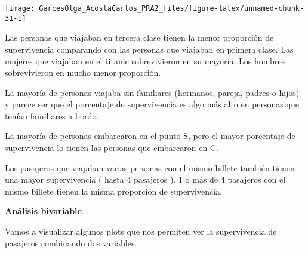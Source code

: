 \documentclass[
]{article}
\begin{document}
\begin{center}\texttt{[image: GarcesOlga\_AcostaCarlos\_PRA2\_files/figure-latex/unnamed-chunk-31-1]} \end{center}

Las personas que viajaban en tercera clase tienen la menor proporción de
supervivencia comparando con las personas que viajaban en primera clase.
Las mujeres que viajaban en el titanic sobrevivieron en su mayoría. Los
hombres sobrevivieron en mucho menor proporción.

La mayoría de personas viajaba sin familiares (hermanos, pareja, padres
o hijos) y parece ser que el porcentaje de supervivencia es algo más
alto en personas que tenían familiares a bordo.

La mayoría de personas embarcaron en el punto S, pero el mayor
porcentaje de supervivencia lo tienen las personas que embarcaron en C.

Los pasajeros que viajaban varias personas con el mismo billete también
tienen una mayor supervivencia ( hasta 4 pasajeros ). 1 o más de 4
pasajeros con el mismo billete tienen la misma proporción de
supervivencia.

\textbf{Análisis bivariable}

Vamos a visualizar algunos plots que nos permiten ver la supervivencia
de pasajeros combinando dos variables.
\end{document}
